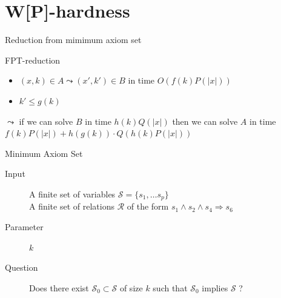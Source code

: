 \documentclass[11pt,xcolor=dvipsnames,presentation,aspectratio=169]{beamer}
\begin{document}
\section*{W[P]-hardness}

\begin{frame}{Reduction from mimimum axiom set}
  \begin{block}{FPT-reduction}
    \begin{itemize}
    \item $(x,k) \in A \leadsto (x',k') \in B$ in time $O(f(k)P(|x|))$
    \item $k' \le g(k)$
    \end{itemize}
    \centering
    $\leadsto$ if we can solve $B$ in time  $h(k)Q(|x|)$ then we can solve $A$
    in time $f(k)P(|x|) + h(g(k))\cdot Q(h(k)P(|x|))$
  \end{block}

  
  \begin{block}{Minimum Axiom Set}
  \begin{description}
  \item[Input] A finite set of variables $\mathcal{S} = \{s_1, \dots s_p\}$\\
    A finite set of relations $\mathcal{R}$ of the form $s_1 \wedge s_2 \wedge
    s_4 \Rightarrow s_6$ 
  \item[Parameter] $k$
  \item[Question] Does there exist $\mathcal{S}_0 \subset \mathcal{S}$ of size $k$ such that $\mathcal{S}_0$
    implies $\mathcal{S}$ ?
  \end{description}
\end{block}
\end{frame}
\end{document}
